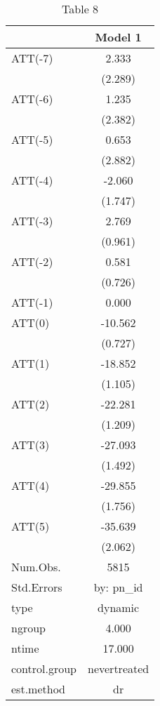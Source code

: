 \begin{table}

\caption{Table 8}
\centering
\begin{tabular}[t]{lc}
\toprule
  & Model 1\\
\midrule
ATT(-7) & 2.333\\
 & (2.289)\\
ATT(-6) & 1.235\\
 & (2.382)\\
ATT(-5) & 0.653\\
 & (2.882)\\
ATT(-4) & -2.060\\
 & (1.747)\\
ATT(-3) & 2.769\\
 & (0.961)\\
ATT(-2) & 0.581\\
 & (0.726)\\
ATT(-1) & 0.000\\
ATT(0) & -10.562\\
 & (0.727)\\
ATT(1) & -18.852\\
 & (1.105)\\
ATT(2) & -22.281\\
 & (1.209)\\
ATT(3) & -27.093\\
 & (1.492)\\
ATT(4) & -29.855\\
 & (1.756)\\
ATT(5) & -35.639\\
 & (2.062)\\
\midrule
Num.Obs. & 5815\\
Std.Errors & by: pn\_id\\
type & dynamic\\
ngroup & 4.000\\
ntime & 17.000\\
control.group & nevertreated\\
est.method & dr\\
\bottomrule
\end{tabular}
\end{table}
